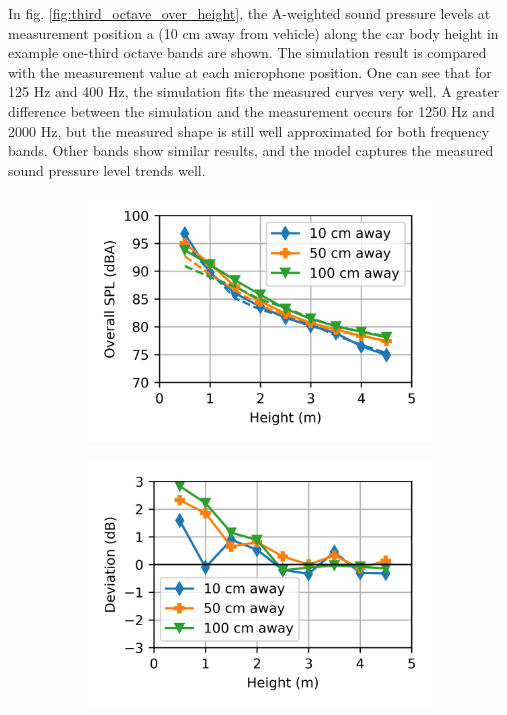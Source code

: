 \noindent In fig. \ref{fig:third_octave_over_height}, the A-weighted sound pressure levels at measurement position a (10 cm away from vehicle) along the car body height in example one-third octave bands are shown. The simulation result is compared with the measurement value at each microphone position. One can see that for 125 Hz and 400 Hz, the simulation fits the measured curves very well. A greater difference between the simulation and the measurement occurs for 1250 Hz and 2000 Hz, but the measured shape is still well approximated for both frequency bands. Other bands show similar results, and the model captures the measured sound pressure level trends well.

\begin{figure}[H]
	\centering
	\begin{subfigure}[b]{0.49\textwidth}
		\centering
		\includegraphics{fig/chap5/initial_model/overall_SPL/all_pos.png}
	\end{subfigure}
	\hfill
	\begin{subfigure}[b]{0.49\textwidth}
		\centering
		\includegraphics{fig/chap5/initial_model/overall_SPL/deviation.png}

\end{subfigure}
\end{figure}
